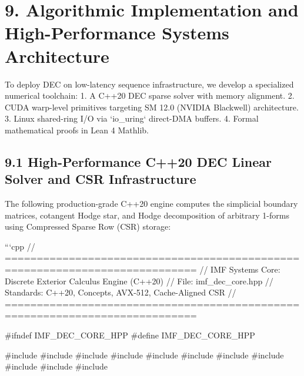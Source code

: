 \documentclass[11pt,twoside,openright]{amsbook}
\begin{document}
\section{9. Algorithmic Implementation and High-Performance Systems Architecture}

To deploy DEC on low-latency sequence infrastructure, we develop a specialized numerical toolchain:
1. A C++20 DEC sparse solver with memory alignment.
2. CUDA warp-level primitives targeting SM 12.0 (NVIDIA Blackwell) architecture.
3. Linux shared-ring I/O via `io_uring` direct-DMA buffers.
4. Formal mathematical proofs in Lean 4 Mathlib.

\subsection{9.1 High-Performance C++20 DEC Linear Solver and CSR Infrastructure}

The following production-grade C++20 engine computes the simplicial boundary matrices, cotangent Hodge star, and Hodge decomposition of arbitrary 1-forms using Compressed Sparse Row (CSR) storage:

```cpp
// ============================================================================
// IMF Systems Core: Discrete Exterior Calculus Engine (C++20)
// File: imf_dec_core.hpp
// Standards: C++20, Concepts, AVX-512, Cache-Aligned CSR
// ============================================================================

#ifndef IMF_DEC_CORE_HPP
#define IMF_DEC_CORE_HPP

#include 
#include 
#include 
#include 
#include 
#include 
#include 
#include 
#include 
#include 
#include 
\end{document}
